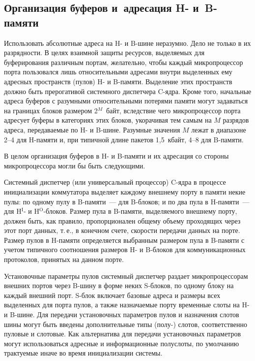\begin{multicols}{2}
\section{Организация буферов и~адресация H- и~B-памяти}

  Использовать абсолютные адреса на H- и B-шине неразумно. Дело не только в их
разрядности. В целях взаимной защиты ресурсов, выделяемых для буферирования различным
портам, желательно, чтобы каждый микропроцессор порта пользовался лишь относительными
адресами внутри выделенных ему адресных пространств (пулов) H- и B-памяти. Выделение
этих пространств должно быть прерогативой системного диспетчера C-ядра. Кроме того,
начальные адреса буферов с разумными относительными потерями памяти могут задаваться на
границах блоков размером 2$^M$~байт, вследствие чего микропроцессор порта адресует
буферы в категориях этих блоков, укорачивая тем самым на $M$ разрядов адреса, передаваемые
по H- и B-шине. Разумные значения $M$ лежат в диапазоне 2--4 для H-памяти и, при типичной
длине пакетов 1,5~кбайт, 4--8 для B-памяти.


    В целом организация буферов в H- и B-памяти и их адресация со стороны микропроцессора могли бы
быть следующими.

    Системный диспетчер (или универсальный процессор) C-ядра в процессе инициализации
коммутатора выделяет каждому внешнему порту в памяти некие пулы: по одному пулу в
B-памяти~--- для B-блоков; и по два пула в H-памяти~--- для H$^{\mathrm{I}}$- и H$^{\mathrm{O}}$-блоков. Размер
пула в B-памяти, вы\-де\-ля\-емо\-го внешнему порту, должен быть, как правило, пропорционален
общему объему проходящих через этот порт данных, т.\,е., в конечном счете, скорости
передачи данных на порте. Размер пулов в H-памяти определяется выбранным размером пула в
B-памяти с учетом типичного соотношения размеров H- и B-блоков для коммуникационных
протоколов, принятых на данном порте.

    Установочные параметры пулов системный диспетчер раздает микропроцессорам внешних
портов через B-шину в форме неких S-блоков, по одному блоку на каждый внешний порт.
S-блок включает базовые адреса и размеры всех выделенных для порта пулов, а также
назначаемые порту временные слоты на H- и B-шине. Для передачи установочных параметров
пулов и назначения слотов шины могут быть введены дополнительные типы (полу-) слотов,
соответственно пуловые и слотовые. Как альтернатива для передачи установочных параметров
могут использоваться адресные и информационные полуслоты, по умолчанию трактуемые
иначе во время инициализации системы.


\end{multicols}
